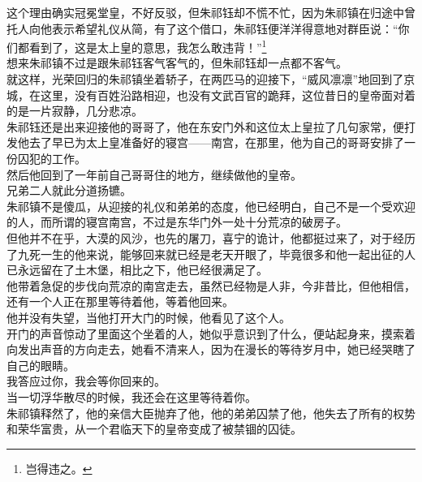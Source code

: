 \begin{multicols}{\theparacolNo}
这个理由确实冠冕堂皇，不好反驳，但朱祁钰却不慌不忙，因为朱祁镇在归途中曾托人向他表示希望礼仪从简，有了这个借口，朱祁钰便洋洋得意地对群臣说：“你们都看到了，这是太上皇的意思，我怎么敢违背！”\footnote{岂得违之。}\\

想来朱祁镇不过是跟朱祁钰客气客气的，但朱祁钰却一点都不客气。\\

就这样，光荣回归的朱祁镇坐着轿子，在两匹马的迎接下，“威风凛凛”地回到了京城，在这里，没有百姓沿路相迎，也没有文武百官的跪拜，这位昔日的皇帝面对着的是一片寂静，几分悲凉。\\

朱祁钰还是出来迎接他的哥哥了，他在东安门外和这位太上皇拉了几句家常，便打发他去了早已为太上皇准备好的寝宫——南宫，在那里，他为自己的哥哥安排了一份囚犯的工作。\\

然后他回到了一年前自己哥哥住的地方，继续做他的皇帝。\\

兄弟二人就此分道扬镳。\\

朱祁镇不是傻瓜，从迎接的礼仪和弟弟的态度，他已经明白，自己不是一个受欢迎的人，而所谓的寝宫南宫，不过是东华门外一处十分荒凉的破房子。\\

但他并不在乎，大漠的风沙，也先的屠刀，喜宁的诡计，他都挺过来了，对于经历了九死一生的他来说，能够回来就已经是老天开眼了，毕竟很多和他一起出征的人已永远留在了土木堡，相比之下，他已经很满足了。\\

他带着急促的步伐向荒凉的南宫走去，虽然已经物是人非，今非昔比，但他相信，还有一个人正在那里等待着他，等着他回来。\\

他并没有失望，当他打开大门的时候，他看见了这个人。\\

开门的声音惊动了里面这个坐着的人，她似乎意识到了什么，便站起身来，摸索着向发出声音的方向走去，她看不清来人，因为在漫长的等待岁月中，她已经哭瞎了自己的眼睛。\\

我答应过你，我会等你回来的。\\

当一切浮华散尽的时候，我还会在这里等待着你。\\

朱祁镇释然了，他的亲信大臣抛弃了他，他的弟弟囚禁了他，他失去了所有的权势和荣华富贵，从一个君临天下的皇帝变成了被禁锢的囚徒。\\


\end{multicols}
